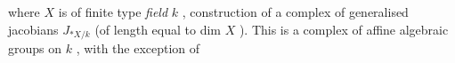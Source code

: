    where $X$ is of finite type   \textit{field} $k$ , construction \margin{\hand{$*\quad *\quad *$}}
of a complex of generalised jacobians $J_{*X/k}$ (of length equal to dim $X$ ).
This is a complex of affine algebraic groups on $k$ , with the exception of

